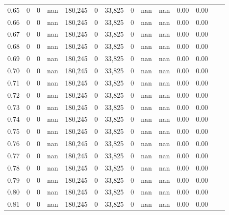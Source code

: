 \begin{tabular}{rrrrrrrrrrrrrr}
0.65 &        0 &       0 &     nan &  180,245 &        0 &  33,825 &       0 &   nan &   nan &  0.00 &      0.00 \\
0.66 &        0 &       0 &     nan &  180,245 &        0 &  33,825 &       0 &   nan &   nan &  0.00 &      0.00 \\
0.67 &        0 &       0 &     nan &  180,245 &        0 &  33,825 &       0 &   nan &   nan &  0.00 &      0.00 \\
0.68 &        0 &       0 &     nan &  180,245 &        0 &  33,825 &       0 &   nan &   nan &  0.00 &      0.00 \\
0.69 &        0 &       0 &     nan &  180,245 &        0 &  33,825 &       0 &   nan &   nan &  0.00 &      0.00 \\
0.70 &        0 &       0 &     nan &  180,245 &        0 &  33,825 &       0 &   nan &   nan &  0.00 &      0.00 \\
0.71 &        0 &       0 &     nan &  180,245 &        0 &  33,825 &       0 &   nan &   nan &  0.00 &      0.00 \\
0.72 &        0 &       0 &     nan &  180,245 &        0 &  33,825 &       0 &   nan &   nan &  0.00 &      0.00 \\
0.73 &        0 &       0 &     nan &  180,245 &        0 &  33,825 &       0 &   nan &   nan &  0.00 &      0.00 \\
0.74 &        0 &       0 &     nan &  180,245 &        0 &  33,825 &       0 &   nan &   nan &  0.00 &      0.00 \\
0.75 &        0 &       0 &     nan &  180,245 &        0 &  33,825 &       0 &   nan &   nan &  0.00 &      0.00 \\
0.76 &        0 &       0 &     nan &  180,245 &        0 &  33,825 &       0 &   nan &   nan &  0.00 &      0.00 \\
0.77 &        0 &       0 &     nan &  180,245 &        0 &  33,825 &       0 &   nan &   nan &  0.00 &      0.00 \\
0.78 &        0 &       0 &     nan &  180,245 &        0 &  33,825 &       0 &   nan &   nan &  0.00 &      0.00 \\
0.79 &        0 &       0 &     nan &  180,245 &        0 &  33,825 &       0 &   nan &   nan &  0.00 &      0.00 \\
0.80 &        0 &       0 &     nan &  180,245 &        0 &  33,825 &       0 &   nan &   nan &  0.00 &      0.00 \\
0.81 &        0 &       0 &     nan &  180,245 &        0 &  33,825 &       0 &   nan &   nan &  0.00 &      0.00 \\

\end{tabular}
